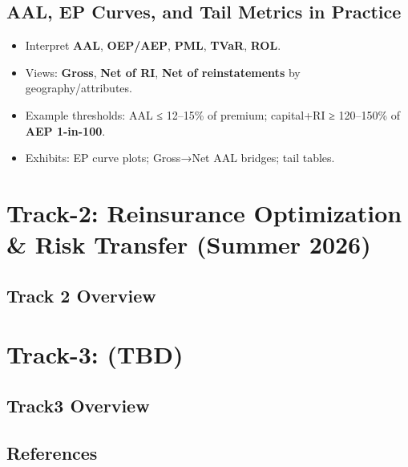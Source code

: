 \documentclass[
  letterpaper,
]{scrbook}
\providecommand{\tightlist}{%
  \setlength{\itemsep}{0pt}\setlength{\parskip}{0pt}}\usepackage{longtable,booktabs,array}
\begin{document}
\chapter{AAL, EP Curves, and Tail Metrics in
Practice}\label{aal-ep-curves-and-tail-metrics-in-practice}

\begin{itemize}
\tightlist
\item
  Interpret \textbf{AAL}, \textbf{OEP/AEP}, \textbf{PML}, \textbf{TVaR},
  \textbf{ROL}.
\item
  Views: \textbf{Gross}, \textbf{Net of RI}, \textbf{Net of
  reinstatements} by geography/attributes.
\item
  Example thresholds: AAL ≤ 12--15\% of premium; capital+RI ≥ 120--150\%
  of \textbf{AEP 1-in-100}.
\item
  Exhibits: EP curve plots; Gross→Net AAL bridges; tail tables.
\end{itemize}

\part{Track-2: Reinsurance Optimization \& Risk Transfer (Summer 2026)}

\chapter{Track 2 Overview}\label{track-2-overview}

\part{Track-3: (TBD)}

\chapter{Track3 Overview}\label{track3-overview}

\cleardoublepage
{}
{}
\appendix

\chapter{References}\label{references}


\backmatter
\end{document}
